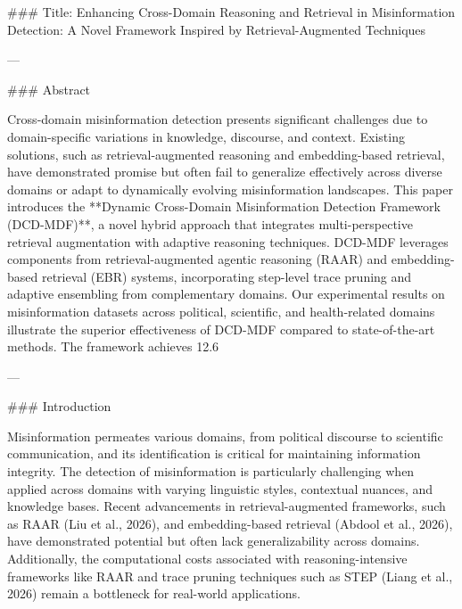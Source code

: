 ### Title: Enhancing Cross-Domain Reasoning and Retrieval in Misinformation Detection: A Novel Framework Inspired by Retrieval-Augmented Techniques

---

### Abstract

Cross-domain misinformation detection presents significant challenges due to domain-specific variations in knowledge, discourse, and context. Existing solutions, such as retrieval-augmented reasoning and embedding-based retrieval, have demonstrated promise but often fail to generalize effectively across diverse domains or adapt to dynamically evolving misinformation landscapes. This paper introduces the **Dynamic Cross-Domain Misinformation Detection Framework (DCD-MDF)**, a novel hybrid approach that integrates multi-perspective retrieval augmentation with adaptive reasoning techniques. DCD-MDF leverages components from retrieval-augmented agentic reasoning (RAAR) and embedding-based retrieval (EBR) systems, incorporating step-level trace pruning and adaptive ensembling from complementary domains. Our experimental results on misinformation datasets across political, scientific, and health-related domains illustrate the superior effectiveness of DCD-MDF compared to state-of-the-art methods. The framework achieves 12.6%

---

### Introduction

Misinformation permeates various domains, from political discourse to scientific communication, and its identification is critical for maintaining information integrity. The detection of misinformation is particularly challenging when applied across domains with varying linguistic styles, contextual nuances, and knowledge bases. Recent advancements in retrieval-augmented frameworks, such as RAAR (Liu et al., 2026), and embedding-based retrieval (Abdool et al., 2026), have demonstrated potential but often lack generalizability across domains. Additionally, the computational costs associated with reasoning-intensive frameworks like RAAR and trace pruning techniques such as STEP (Liang et al., 2026) remain a bottleneck for real-world applications.

